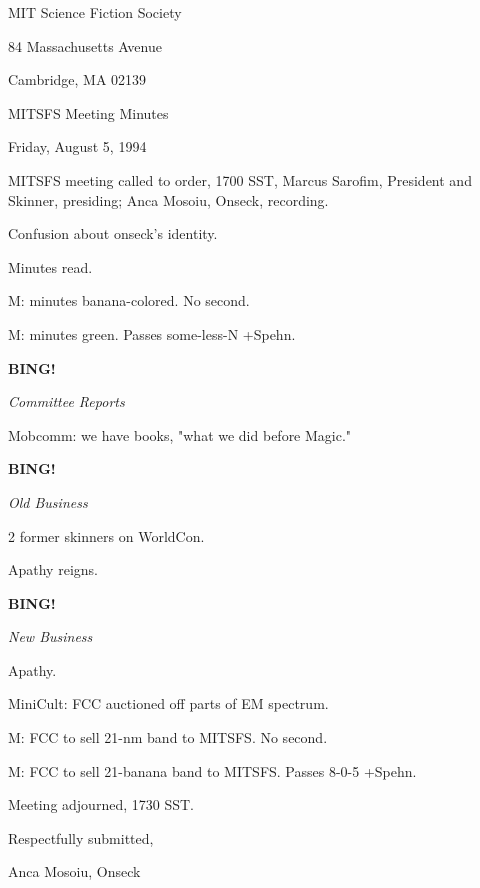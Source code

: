 \documentclass[12pt]{article}
\newcommand{\bing}{{\bf BING!} }
\newcommand{\goto}[1]{\bing \vskip 12pt \centerline{{\em{#1}}}}
\begin{document}
\begin{center}

MIT Science Fiction Society 

84 Massachusetts Avenue

Cambridge, MA 02139

\vspace{12pt}

MITSFS Meeting Minutes 

Friday, August 5, 1994

\end{center}
 
\vspace{18pt}

\setlength{\parskip}{6pt}

\noindent
MITSFS meeting called to order, 1700 SST,
Marcus Sarofim, President and Skinner, presiding; Anca Mosoiu, Onseck, recording.

Confusion about onseck's identity.

Minutes read.

M: minutes banana-colored. No second.

M: minutes green. Passes some-less-N +Spehn.

\goto{Committee Reports}

Mobcomm: we have books, "what we did before Magic."

\goto{Old Business}

2 former skinners on WorldCon.

Apathy reigns.

\goto{New Business}

Apathy.

MiniCult: FCC auctioned off parts of EM spectrum.

M: FCC to sell 21-nm band to MITSFS. No second.

M: FCC to sell 21-banana band to MITSFS. Passes 8-0-5 +Spehn.

\vspace{12pt}

\noindent
Meeting adjourned, 1730 SST.

\vspace{18pt}

\centerline{Respectfully submitted,}
\centerline{Anca Mosoiu, Onseck}
\end{document}
